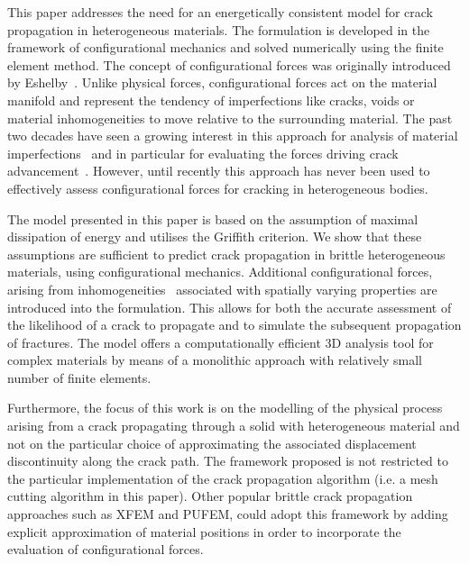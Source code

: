 \documentclass[onecolumn]{svjour3}
\begin{document}
This paper addresses the need for an energetically consistent model for crack propagation in heterogeneous materials.
The formulation is developed in the framework of configurational mechanics and solved numerically using the finite element method.
The concept of configurational forces was originally introduced by Eshelby~\cite{eshelby1951force}. 
Unlike physical forces, configurational forces act on the material manifold and represent the tendency of imperfections like cracks, 
voids or material inhomogeneities to move relative to the surrounding material. 
The past two decades have seen a growing interest in this approach for analysis of material imperfections~\cite{maugin2016configurational} and in particular for evaluating the forces driving crack advancement~\cite{kaczmarczyk2017energy,steinmann2001application, ozencc2016configurational}. 
However, until recently this approach has never been used to effectively assess configurational forces for cracking in heterogeneous bodies. 

The model presented in this paper is based on the assumption of maximal dissipation of energy and utilises the Griffith criterion. 
We show that these assumptions are sufficient to predict crack propagation in brittle heterogeneous materials, 
using configurational mechanics. 
Additional configurational forces, arising from inhomogeneities~\cite{kienzler2014configurational}
associated with spatially varying properties are introduced into the formulation. This allows for both the accurate assessment of the likelihood of a crack to propagate and to simulate the subsequent propagation of fractures. 
The model offers a computationally efficient 3D analysis tool for complex materials by means of a monolithic approach 
with relatively small number of finite elements.

Furthermore, the focus of this work is on the modelling of the physical process arising from a crack propagating through a solid with heterogeneous material and not on the particular choice of approximating the associated displacement discontinuity along the crack path.
The framework proposed is not restricted to the particular implementation of the crack propagation algorithm (i.e. a mesh cutting algorithm in this paper).
Other popular brittle crack propagation approaches such as XFEM and PUFEM, \citep{Belytschko1999, WriggersXFEM, Babuska2017, Tian2019} could adopt this framework by adding explicit approximation of material positions in order to incorporate the evaluation of configurational forces.  
\end{document}

